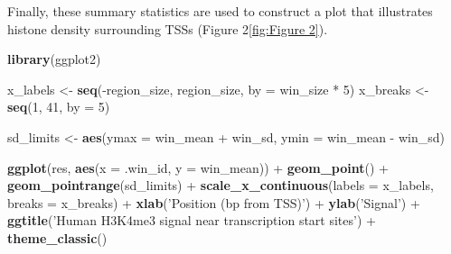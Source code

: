 \documentclass[9pt,a4paper]{extarticle}
\renewcommand{\KeywordTok}[1]{\textbf{{#1}}}
\renewcommand{\DataTypeTok}[1]{\textcolor[rgb]{0.50,0.00,0.00}{{#1}}}
\renewcommand{\DecValTok}[1]{\textcolor[rgb]{0.00,0.00,1.00}{{#1}}}
\renewcommand{\StringTok}[1]{\textcolor[rgb]{0.87,0.00,0.00}{{#1}}}
\renewcommand{\CommentTok}[1]{\textcolor[rgb]{0.50,0.50,0.50}{\textit{{#1}}}}
\renewcommand{\OtherTok}[1]{{#1}}
\renewcommand{\NormalTok}[1]{{#1}}
\begin{document}

Finally, these summary statistics are used to construct a plot that
illustrates histone density surrounding TSSs (Figure 2\ref{fig:Figure 2}).

\begin{Highlighting}[]
\KeywordTok{library}\NormalTok{(ggplot2)}

\NormalTok{x_labels <-}\StringTok{ }\KeywordTok{seq}\NormalTok{(-region_size, region_size, }\DataTypeTok{by =} \NormalTok{win_size *}\StringTok{ }\DecValTok{5}\NormalTok{)}
\NormalTok{x_breaks <-}\StringTok{ }\KeywordTok{seq}\NormalTok{(}\DecValTok{1}\NormalTok{, }\DecValTok{41}\NormalTok{, }\DataTypeTok{by =} \DecValTok{5}\NormalTok{)}

\NormalTok{sd_limits <-}\StringTok{ }\KeywordTok{aes}\NormalTok{(}\DataTypeTok{ymax =} \NormalTok{win_mean +}\StringTok{ }\NormalTok{win_sd, }\DataTypeTok{ymin =} \NormalTok{win_mean -}\StringTok{ }\NormalTok{win_sd)}

\KeywordTok{ggplot}\NormalTok{(res, }\KeywordTok{aes}\NormalTok{(}\DataTypeTok{x =} \NormalTok{.win_id, }\DataTypeTok{y =} \NormalTok{win_mean)) +}
\StringTok{  }\KeywordTok{geom_point}\NormalTok{() +}\StringTok{ }\KeywordTok{geom_pointrange}\NormalTok{(sd_limits) +}\StringTok{ }
\StringTok{  }\KeywordTok{scale_x_continuous}\NormalTok{(}\DataTypeTok{labels =} \NormalTok{x_labels, }\DataTypeTok{breaks =} \NormalTok{x_breaks) +}\StringTok{ }
\StringTok{  }\KeywordTok{xlab}\NormalTok{(}\StringTok{'Position (bp from TSS)'}\NormalTok{) +}\StringTok{ }\KeywordTok{ylab}\NormalTok{(}\StringTok{'Signal'}\NormalTok{) +}\StringTok{ }
\StringTok{  }\KeywordTok{ggtitle}\NormalTok{(}\StringTok{'Human H3K4me3 signal near transcription start sites'}\NormalTok{) +}
\StringTok{  }\KeywordTok{theme_classic}\NormalTok{()}
\end{Highlighting}
\end{document}
